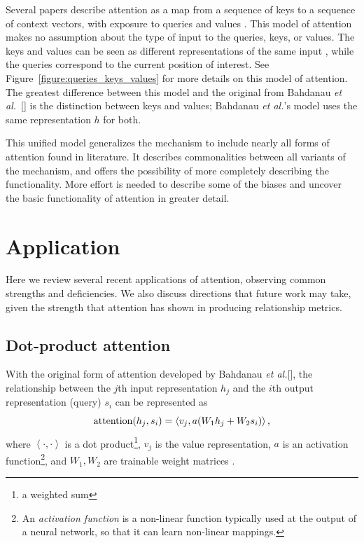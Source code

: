 \documentclass{article}
\newcommand{\etal}{\textit{et al.}}
\begin{document}
Several papers describe attention as a map from a sequence of keys to a sequence of context vectors, with exposure to queries and values \cite{attn_all_you_need,attention_please}. This model of attention makes no assumption about the type of input to the queries, keys, or values. The keys and values can be seen as different representations of the same input \cite{attention_please}, while the queries correspond to the current position of interest. See Figure~\ref{figure:queries_keys_values} for more details on this model of attention. The greatest difference between this model and the original from Bahdanau \etal~[\citeyear{joint_align_translate}] is the distinction between keys and values; Bahdanau \etal's model uses the same representation $h$ for both.

This unified model generalizes the mechanism to include nearly all forms of attention found in literature. It describes commonalities between all variants of the mechanism, and offers the possibility of more completely describing the functionality. More effort is needed to describe some of the biases and uncover the basic functionality of attention in greater detail.

\section{Application}

Here we review several recent applications of attention, observing common strengths and deficiencies. We also discuss directions that future work may take, given the strength that attention has shown in producing relationship metrics.

\subsection{Dot-product attention}

With the original form of attention developed by Bahdanau \etal [\citeyear{joint_align_translate}], the relationship between the $j$th input representation $h_j$ and the $i$th output representation (query) $s_i$ can be represented as
\[
\text{attention}(h_j,s_i)=\left<v_j,a(W_1h_j+W_2s_i)\right>\text,
\]
where $\left<\cdot,\cdot\right>$ is a dot product\footnote{a weighted sum}, $v_j$ is the value representation, $a$ is an activation function\footnote{An \textit{activation function} is a non-linear function typically used at the output of a neural network, so that it can learn non-linear mappings.}, and $W_1,W_2$ are trainable weight matrices \cite{massive_exploration}.
\end{document}
